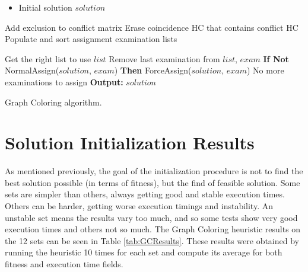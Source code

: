 
\begin{algorithm}
\begin{itemize}
\item Initial solution $solution$
\end{itemize}

\begin{algorithmic}[1]
\State Add exclusion to conflict matrix
\State Erase coincidence HC that contains conflict HC
\State Populate and sort assignment examination lists

\Repeat
	\State Get the right list to use $list$
	\State Remove last examination from $list$, $exam$
	\State \textbf{If Not} NormalAssign($solution$, $exam$) \textbf{Then} ForceAssign($solution$, $exam$)
\Until No more examinations to assign
\State  \textbf{Output:} $solution$
\end{algorithmic}
\caption{Graph Coloring algorithm.}
\label{alg:GraphColoring}
\end{algorithm}

\section{Solution Initialization Results}

As mentioned previously, the goal of the initialization procedure is not to find the best solution possible (in terms of fitness), but the find of feasible solution. Some sets are simpler than others, always getting good and stable execution times. Others can be harder, getting worse execution timings and instability. An unstable set means the results vary too much, and so some tests show very good execution times and others not so much. The Graph Coloring heuristic results on the 12 sets can be seen in Table \ref{tab:GCResults}. These results were obtained by running the heuristic 10 times for each set and compute its average for both fitness and execution time fields. \\
\\



